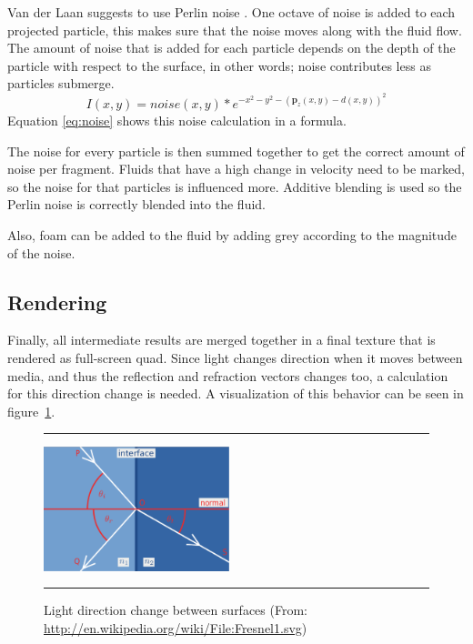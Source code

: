 Van der Laan \cite{van2009screen} suggests to use Perlin noise \cite{perlin1985image}.
One octave of noise is added to each projected particle, this makes sure that the noise moves along with the fluid flow.
The amount of noise that is added for each particle depends on the depth of the particle with respect to the surface, in other words; noise contributes less as particles submerge.
\begin{equation}
\label{eq:noise}
	I(x,y) = noise(x,y) \ast e^{-x^2 - y^2 - (\mathbf{p}_z(x,y)-d(x,y))^2}
\end{equation}
Equation \ref{eq:noise} shows this noise calculation in a formula.

The noise for every particle is then summed together to get the correct amount of noise per fragment.
Fluids that have a high change in velocity need to be marked, so the noise for that particles is influenced more.
Additive blending is used so the Perlin noise is correctly blended into the fluid.

Also, foam can be added to the fluid by adding grey according to the magnitude of the noise.

\subsection{Rendering}
Finally, all intermediate results are merged together in a final texture that is rendered as full-screen quad.
Since light changes direction when it moves between media, and thus the reflection and refraction vectors changes too, a calculation for this direction change is needed.
A visualization of this behavior can be seen in figure~\ref{fig:fresnel}.
\begin{figure}[!th]
\hrule
\begin{center}
\vspace*{2ex}\includegraphics[width=0.48\textwidth]{pictures/Fresnel.eps}
\end{center}
\caption{Light direction change between surfaces (From: \url{http://en.wikipedia.org/wiki/File:Fresnel1.svg})}
\label{fig:fresnel} 
\vspace*{2ex}
\hrule
\end{figure}

